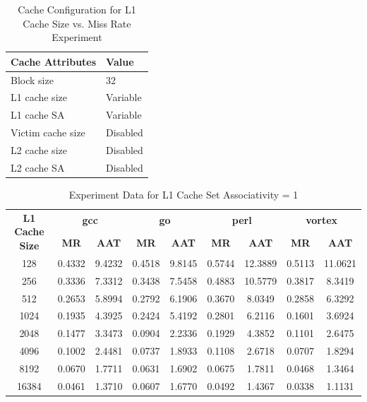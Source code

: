 \documentclass[a4paper]{article}
\begin{document}
\begin{table}[htbp]
    \centering
    \begin{center}
        \begin{tabular}{|l|l|}
            \hline
            \bf Cache Attributes & \bf Value \\ \hline
            Block size &  32 \\
            L1 cache size & Variable \\
            L1 cache SA & Variable \\
            Victim cache size & Disabled \\
            L2 cache size & Disabled \\
            L2 cache SA & Disabled \\
            \hline
        \end{tabular}
        \captionsetup{justification=centering}
        \caption{Cache Configuration for L1 Cache Size vs. Miss Rate Experiment}
        \label{tab:l1mr_config}
    \end{center}
\end{table}

\begin{table}[htbp]
    \centering
    \begin{tabular}{|c|c|c|c|c|c|c|c|c|}
        \hline
        \multirow{2}[4]{*}{\bf L1 Cache Size} & \multicolumn{2}{c|}{\bf gcc} & \multicolumn{2}{c|}{\bf go} & \multicolumn{2}{c|}{\bf perl}          &\multicolumn{2}{c|}{\bf vortex}\\
        \cline{2-9} & \bf MR & \bf AAT & \bf MR & \bf AAT & \bf MR & \bf AAT & \bf MR & \bf AAT \\
        \hline
        128 & 0.4332 & 9.4232 & 0.4518 & 9.8145 & 0.5744 & 12.3889 & 0.5113 & 11.0621 \\
        256 & 0.3336 & 7.3312 & 0.3438 & 7.5458 & 0.4883 & 10.5779 & 0.3817 & 8.3419 \\
        512 & 0.2653 & 5.8994 & 0.2792 & 6.1906 & 0.3670 & 8.0349 & 0.2858 & 6.3292 \\
        1024 & 0.1935 & 4.3925 & 0.2424 & 5.4192 & 0.2801 & 6.2116 & 0.1601  & 3.6924 \\
        2048 & 0.1477 & 3.3473 & 0.0904 & 2.2336 & 0.1929 & 4.3852 & 0.1101 & 2.6475 \\
        4096 & 0.1002 & 2.4481 & 0.0737 & 1.8933 & 0.1108 & 2.6718 & 0.0707 & 1.8294 \\
        8192 & 0.0670 & 1.7711 & 0.0631 & 1.6902 & 0.0675 & 1.7811 & 0.0468 & 1.3464 \\
        16384 & 0.0461 & 1.3710& 0.0607 & 1.6770& 0.0492 & 1.4367 & 0.0338 & 1.1131 \\
        \hline
    \end{tabular}
    \captionsetup{justification=centering}
    \caption{Experiment Data for L1 Cache Set Associativity = 1}
    \label{tab:l1mr_data_sa1}
\end{table}
\end{document}
